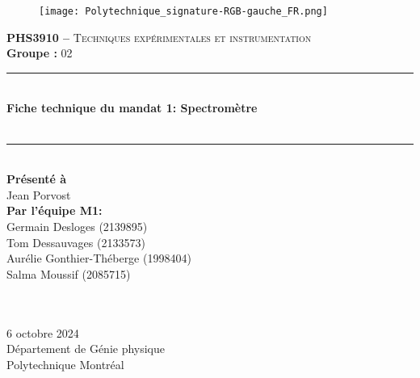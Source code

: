 \begin{titlepage}\center

\begin{figure}
    \texttt{[image: Polytechnique\_signature-RGB-gauche\_FR.png]}
\end{figure}
\vspace*{0.5cm}

\textsc{\Large \textbf{PHS3910 --} Techniques expérimentales et instrumentation}\\[0.5cm] 
\large{\textbf{Groupe : }02}
\\[1.5cm] 

\rule{\linewidth}{0.5mm} \\[0.5cm]
\Large{\textbf{ Fiche technique du mandat 1: Spectromètre}} \\[0.5cm] \\[0.2cm]
\rule{\linewidth}{0.5mm} \\[2cm]

\large{
 \textbf{Présenté à}\\
 Jean Porvost\\
 [2cm]

  \textbf{Par l'équipe M1:}\\
Germain Desloges (2139895)\\
Tom Dessauvages (2133573) \\
Aurélie Gonthier-Théberge (1998404)\\
Salma Moussif (2085715) \\

 \textbf{} \\
 \textbf{} \\[1cm]}

\large{
6 octobre 2024\\
Département de Génie physique\\
Polytechnique Montréal\\}


\end{titlepage}

